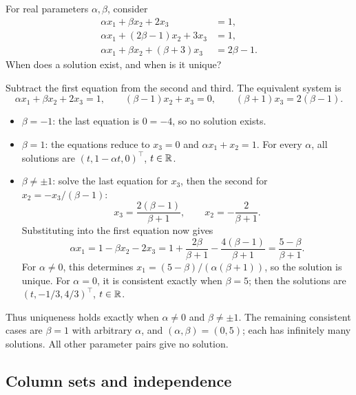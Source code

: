 \begin{problem}\label{ex:01:two-parameter-consistency}
For real parameters $\alpha,\beta$, consider
\[
\begin{aligned}
\alpha x_1+\beta x_2+2x_3&=1,\\
\alpha x_1+(2\beta-1)x_2+3x_3&=1,\\
\alpha x_1+\beta x_2+(\beta+3)x_3&=2\beta-1.
\end{aligned}
\]
When does a solution exist, and when is it unique?
\end{problem}
\begin{solution}
Subtract the first equation from the second and third. The equivalent
system is
\[
\alpha x_1+\beta x_2+2x_3=1,\qquad
(\beta-1)x_2+x_3=0,\qquad
(\beta+1)x_3=2(\beta-1).
\]
\begin{itemize}
\item $\beta=-1$: the last equation is $0=-4$, so no solution exists.
\item $\beta=1$: the equations reduce to $x_3=0$ and
$\alpha x_1+x_2=1$. For every $\alpha$, all solutions are
$(t,1-\alpha t,0)^\top$, $t\in\mathbb R$.
\item $\beta\ne\pm1$: solve the last equation for $x_3$, then the
second for $x_2=-x_3/(\beta-1)$:
\[
x_3=\frac{2(\beta-1)}{\beta+1},\qquad
x_2=-\frac2{\beta+1}.
\]
Substituting into the first equation now gives
\[
\alpha x_1=1-\beta x_2-2x_3
=1+\frac{2\beta}{\beta+1}-\frac{4(\beta-1)}{\beta+1}
=\frac{5-\beta}{\beta+1}.
\]
For $\alpha\ne0$, this determines
$x_1=(5-\beta)/(\alpha(\beta+1))$, so the solution is unique.
For $\alpha=0$, it is consistent exactly when $\beta=5$; then the solutions
are $(t,-1/3,4/3)^\top$, $t\in\mathbb R$.
\end{itemize}
Thus uniqueness holds exactly when $\alpha\ne0$ and $\beta\ne\pm1$.
The remaining consistent cases are $\beta=1$ with arbitrary $\alpha$,
and $(\alpha,\beta)=(0,5)$; each has infinitely many solutions.
All other parameter pairs give no solution.
\end{solution}

\subsection*{Column sets and independence}

